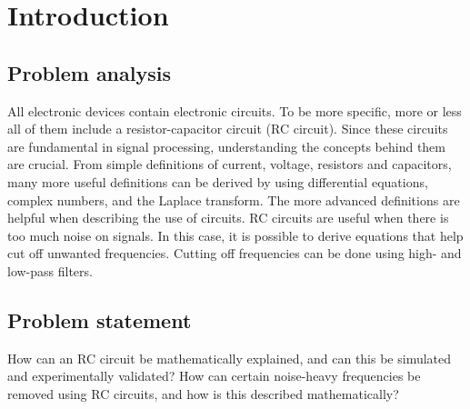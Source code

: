 \chapter{Introduction}
\section{Problem analysis}
All electronic devices contain electronic circuits. To be more specific, more or less all of them include a resistor-capacitor circuit (RC circuit). Since these circuits are fundamental in signal processing, understanding the concepts behind them are crucial. From simple definitions of current, voltage, resistors and capacitors, many more useful definitions can be derived by using differential equations, complex numbers, and the Laplace transform. The more advanced definitions are helpful when describing the use of circuits. RC circuits are useful when there is too much noise on signals. In this case, it is possible to derive equations that help cut off unwanted frequencies. Cutting off frequencies can be done using high- and low-pass filters. 

\section{Problem statement}

How can an RC circuit be mathematically explained, and can this be simulated and experimentally validated? How can certain noise-heavy frequencies be removed using RC circuits, and how is this described mathematically?